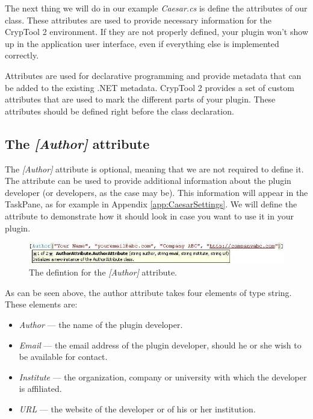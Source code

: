 The next thing we will do in our example \textit{Caesar.cs} is define the attributes of our class. These attributes are used to provide necessary information for the CrypTool 2 environment. If they are not properly defined, your plugin won't show up in the application user interface, even if everything else is implemented correctly.

Attributes are used for declarative programming and provide metadata that can be added to the existing .NET metadata. CrypTool 2 provides a set of custom attributes that are used to mark the different parts of your plugin. These attributes should be defined right before the class declaration.
\clearpage

\subsection{The \protect\textit{[Author]} attribute}
\label{sec:TheAuthorAttribute}

The \textit{[Author]} attribute is optional, meaning that we are not required to define it. The attribute can be used to provide additional information about the plugin developer (or developers, as the case may be). This information will appear in the TaskPane, as for example in Appendix \ref{app:CaesarSettings}. We will define the attribute to demonstrate how it should look in case you want to use it in your plugin.

\begin{figure}[h!]
	\centering
		\includegraphics[width=.90\textwidth]{figures/attribute_author.jpg}
	\caption{The defintion for the \textit{[Author]} attribute.}
	\label{fig:attribute_author}
\end{figure}

As can be seen above, the author attribute takes four elements of type string. These elements are:

\begin{itemize}
	\item \textit{Author} --- the name of the plugin developer.
	\item \textit{Email} --- the email address of the plugin developer, should he or she wish to be available for contact.
	\item \textit{Institute} --- the organization, company or university with which the developer is affiliated.
	\item \textit{URL} --- the website of the developer or of his or her institution.
\end{itemize}

